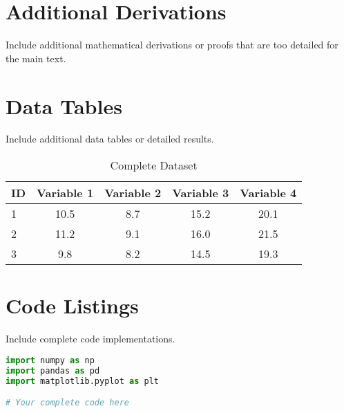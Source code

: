 \documentclass[12pt,a4paper]{article}
\theoremstyle{definition}
\begin{document}
\newpage
\begin{appendices}

\section{Additional Derivations}
\label{app:derivations}

Include additional mathematical derivations or proofs that are too detailed
for the main text.

\section{Data Tables}
\label{app:data}

Include additional data tables or detailed results.

\begin{table}[H]
\centering
\caption{Complete Dataset}
\label{tab:complete_data}
\begin{tabular}{@{}lcccc@{}}
\toprule
ID & Variable 1 & Variable 2 & Variable 3 & Variable 4 \\
\midrule
1 & 10.5 & 8.7 & 15.2 & 20.1 \\
2 & 11.2 & 9.1 & 16.0 & 21.5 \\
3 & 9.8 & 8.2 & 14.5 & 19.3 \\
\bottomrule
\end{tabular}
\end{table}

\section{Code Listings}
\label{app:code}

Include complete code implementations.

\begin{lstlisting}[language=Python, caption=Complete Analysis Script]
import numpy as np
import pandas as pd
import matplotlib.pyplot as plt

# Your complete code here
\end{lstlisting}

\end{appendices}
\end{document}
